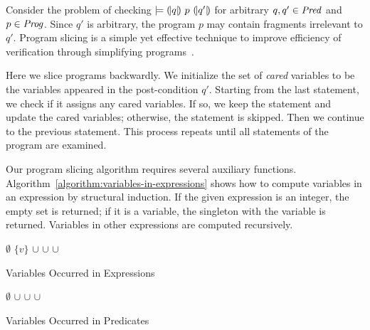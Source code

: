 
Consider the problem of checking $\models {(\!|}{q}{|\!)}~{p}~{(\!|}{q'}{|\!)}$ for
arbitrary $q, q' \in \mathit{Pred}$ and $p \in \mathit{Prog}$. Since $q'$ is arbitrary, the
program $p$ may contain fragments irrelevant to $q'$. Program slicing
is a simple yet effective technique to improve efficiency of
verification through simplifying programs~\cite{W:81:PS}.

Here we slice programs backwardly. We initialize the set
of \emph{cared} variables to be the variables appeared in the
post-condition $q'$. Starting from the last statement, we check if
it assigns any cared variables. If so, we keep the
statement and update the cared variables; otherwise, the
statement is skipped. Then we continue to the previous statement.
This process repeats until all statements of the
program are examined.

Our program slicing algorithm requires several auxiliary functions. 
Algorithm~\ref{algorithm:variables-in-expressions} shows how to
compute variables in an expression by structural
induction. If the given expression is an integer,
the empty set is returned; if it is a variable, the singleton with the
variable is returned. Variables in other expressions are computed
recursively. 

\begin{algorithm}
  \begin{algorithmic}[1]
        \Return $\emptyset$
      \EndCase
        \Return $\{ v \}$
      \EndCase
        \Return {}
      \EndCase
        \Return {} $\cup$ 
      \EndCase
        \Return {} $\cup$ 
      \EndCase
        \Return {} $\cup$ 
      \EndCase
        \Return {}
      \EndCase
    \EndMatch
    \EndFunction
  \end{algorithmic}
  \caption{Variables Occurred in Expressions}
  \label{algorithm:variables-in-expressions}
\end{algorithm}

\vspace{-1em}
\begin{algorithm}
\begin{algorithmic}[1]
    \Case{$\top$}
      \Return $\emptyset$
    \EndCase
      \Return {} $\cup$ 
    \EndCase
      \Return {} $\cup$ 
    \EndCase
      \Return {} $\cup$ 
    \EndCase
  \EndMatch
  \EndFunction
\end{algorithmic}
\caption{Variables Occurred in Predicates}
\label{algorithm:variables-in-predicates}
\end{algorithm}

